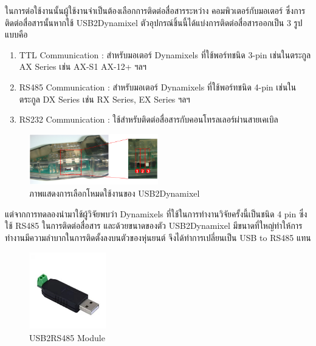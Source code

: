 ในการต่อใช้งานนั้นผู้ใช้งานจำเป็นต้องเลือกการติดต่อสื่อสารระหว่าง คอมพิวเตอร์กับมอเตอร์
ซึ่งการติดต่อสื่อสารนั้นหากใช้ USB2Dynamixel ตัวอุปกรณ์ชิ้นนี้ได้แบ่งการติดต่อสื่อสารออกเป็น 3 รูปแบบคือ
\vspace{-10pt}
\begin{enumerate}[label=\arabic*, leftmargin=1.5cm]
    \setlength\itemsep{-0.25em}
    \item TTL Communication : สำหรับมอเตอร์ Dynamixels ที่ใช้พอร์ทชนิด 3-pin เช่นในตระกูล AX Series เช่น AX-S1 AX-12+ ฯลฯ
    \item RS485 Communication : สำหรับมอเตอร์ Dynamixels ที่ใช้พอร์ทชนิด 4-pin เช่นในตระกูล DX Series เช่น RX Series, EX Series ฯลฯ
    \item RS232 Communication : ใช้สำหรับติดต่อสื่อสารกับคอนโทรลเลอร์ผ่านสายเคเบิล
\end{enumerate}
\vspace{-15pt}
\begin{figure}[!ht]
    \centering
    \includegraphics[width=0.5\textwidth]{chapter3/images/useusb2dynamixel.png}
    \caption{ภาพแสดงการเลือกโหมดใช้งานของ USB2Dynamixel}
    \label{fig:useusb2dynamixel}
\end{figure}

แต่จากการทดลองนำมาใช้ผู้วิจัยพบว่า Dynamixels ที่ใช้ในการทำงานวิจัยครั้งนี้เป็นชนิด 4 pin ซึ่งใช้ RS485 ในการติดต่อสื่อสาร
และด้วยขนาดของตัว USB2Dynamixel มีขนาดที่ใหญ่ทำให้การทำงานมีความลำบากในการติดตั้งลงบนตัวของหุ่นยนต์
จึงได้ทำการเปลี่ยนเป็น USB to RS485 แทน
\begin{figure}[!ht]
    \centering
    \includegraphics[width=0.3\textwidth]{chapter3/images/usb2rs485.jpg}
    \caption{USB2RS485 Module}
    \label{fig:usb2rs485}
\end{figure}

\clearpage
